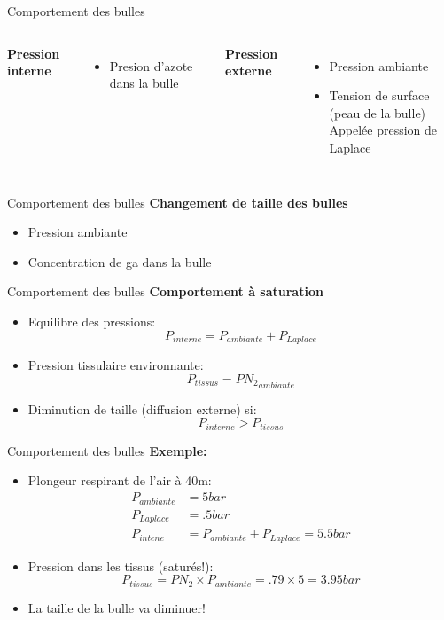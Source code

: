 \begin{frame}{Comportement des bulles}
    \begin{columns} %

		\textbf{Pression interne}
		\begin{itemize}
			\item Presion d'azote dans la bulle
		\end{itemize}

		\vspace{1em}
		
		\textbf{Pression externe}
		\begin{itemize}
			\item Pression ambiante
			\item Tension de surface (peau de la bulle)\\Appelée pression de Laplace
		\end{itemize}
    \end{columns}
\end{frame}

\begin{frame}{Comportement des bulles}
	\textbf{Changement de taille des bulles}
		\begin{itemize}
			\item Pression ambiante
			\item Concentration de ga dans la bulle
		\end{itemize}
\end{frame}

\begin{frame}{Comportement des bulles}  
	\textbf{Comportement à saturation}
	\begin{itemize}
		\item Equilibre des pressions:$$P_{interne} = P_{ambiante}+P_{Laplace}$$ \pause
		\item Pression tissulaire environnante:$$P_{tissus}= PN{_2}_{ambiante}$$ \pause
		\item Diminution de taille (diffusion externe) si: $$P_{interne} > P_{tissus}$$
	\end{itemize}
\end{frame}

\begin{frame}{Comportement des bulles}  
	\textbf{Exemple:}
	\begin{itemize}
		\item Plongeur respirant de l'air à 40m:
				\begin{align*}
					P_{ambiante} &= 5 bar\\
					P_{Laplace} &= .5 bar\\
					P_{intene} &= P_{ambiante} + P_{Laplace} = 5.5 bar
				\end{align*} \pause

		\item Pression dans les tissus (saturés!):
				$$P_{tissus} = PN_2 \times P_{ambiante} = .79 \times 5 =3.95 bar $$ \pause

		\item La taille de la bulle va diminuer!
	\end{itemize}
\end{frame}

